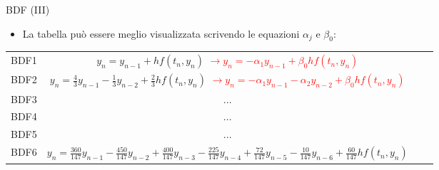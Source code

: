 \documentclass[aspectratio=169, 10pt, handout,usenames,dvipsnames]{beamer}
\begin{document}
\begin{frame}{BDF (III)}
        \begin{itemize}
            \item {La tabella può essere meglio visualizzata scrivendo le equazioni $\alpha_j$ e $\beta_0$:}
        \end{itemize}
        
    \begin{center}
        \begin{table}[]
            \begin{tabular}{ScSl}
            BDF1 & \( y_n = y_{n-1} + h f(t_{n}, y_{n})\) \textcolor{red}{\( \rightarrow  y_{n} = -\alpha_1y_{n-1} + \beta_0h f(t_{n}, y_{n})\)}\\
            BDF2 & \(y_{n} = \tfrac43 y_{n-1} - \tfrac13 y_{n-2} + \tfrac23 h f(t_{n}, y_{n}) \) \textcolor{red}{\(\rightarrow y_{n} = -\alpha_1y_{n-1} -\alpha_2y_{n-2} + \beta_0h f(t_{n}, y_{n}) \)}\\
            
            BDF3 & ...\\%
            BDF4 & ...\\ %
            BDF5 & ...\\ %
            BDF6 & \(y_{n} = \tfrac{360}{147} y_{n-1} - \tfrac{450}{147} y_{n-2} + \tfrac{400}{147} y_{n-3} - \tfrac{225}{147} y_{n-4} + \tfrac{72}{147} y_{n-5} - \tfrac{10}{147} y_{n-6} + \tfrac{60}{147} h f(t_{n}, y_{n}) \) 
            \end{tabular}
        \end{table}
    \end{center}
\end{frame}
\end{document}
